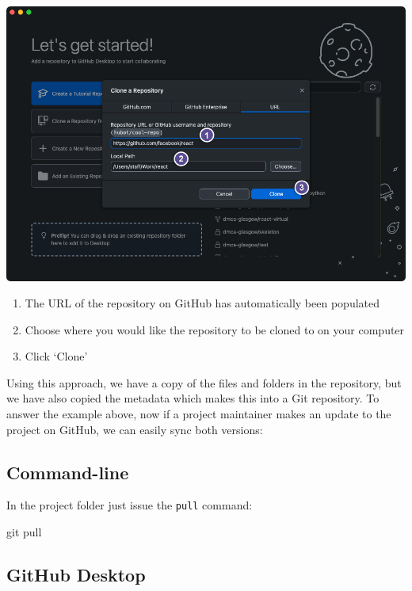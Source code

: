 \documentclass[
  letterpaper,
  DIV=11,
  numbers=noendperiod]{scrartcl}
\newenvironment{Shaded}{\begin{snugshade}}{\end{snugshade}}
\newcommand{\NormalTok}[1]{\textcolor[rgb]{0.00,0.23,0.31}{#1}}
\begin{document}
\includegraphics{images/image25.png}

\begin{enumerate}
\def\labelenumi{\arabic{enumi}.}
\item
  The URL of the repository on GitHub has automatically been populated
\item
  Choose where you would like the repository to be cloned to on your
  computer
\item
  Click `Clone'
\end{enumerate}

Using this approach, we have a copy of the files and folders in the
repository, but we have also copied the metadata which makes this into a
Git repository. To answer the example above, now if a project maintainer
makes an update to the project on GitHub, we can easily sync both
versions:

\subsection{Command-line}

In the project folder just issue the \texttt{pull} command:

\begin{Shaded}
\begin{Highlighting}[]
\NormalTok{git pull}
\end{Highlighting}
\end{Shaded}

\subsection{GitHub Desktop}
\end{document}
